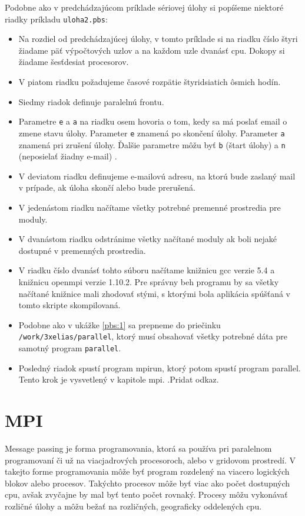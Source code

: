 Podobne ako v predchádzajúcom príklade sériovej úlohy si popíšeme niektoré riadky príkladu \texttt{uloha2.pbs}:
\begin{itemize}
\item
  Na rozdiel od predchádzajúcej úlohy, v tomto príklade si na riadku číslo štyri žiadame päť výpočtových uzlov a na každom uzle dvanásť \acrshort{cpu}.
  Dokopy si žiadame šesťdesiat procesorov.
\item
  V piatom riadku požadujeme časové rozpätie štyridsiatich ôsmich hodín.
\item
  Siedmy riadok definuje paralelnú frontu.
\item
  Parametre \texttt{e} a \texttt{a} na riadku osem hovoria o tom, kedy sa má poslať email o zmene stavu úlohy.
  Parameter \texttt{e} znamená po skončení úlohy.
  Parameter \texttt{a} znamená pri zrušení úlohy.
  Ďalšie parametre môžu byť \texttt{b} (štart úlohy) a \texttt{n} (neposielať žiadny e-mail) \cite{cmd:qsub}.
\item
  V deviatom riadku definujeme e-mailovú adresu, na ktorú bude zaslaný mail v prípade, ak úloha skončí alebo bude prerušená.
\item
  V jedenástom riadku načítame všetky potrebné premenné prostredia pre moduly.
\item
  V dvanástom riadku odstránime všetky načítané moduly ak boli nejaké dostupné v premenných prostredia.
\item
  V riadku číslo dvanásť tohto súboru načítame knižnicu gcc verzie 5.4 a knižnicu openmpi verzie 1.10.2.
  Pre správny beh programu by sa všetky načítané knižnice mali zhodovať stými, s ktorými bola aplikácia spúšťaná v tomto skripte skompilovaná.
\item
  Podobne ako v ukážke \ref{pbs:1} sa prepneme do priečinku \texttt{/work/3xelias/parallel}, ktorý musí obsahovať všetky potrebné dáta
  pre samotný program \texttt{parallel}.
\item
  Posledný riadok spustí program mpirun, ktorý potom spustí program parallel. Tento krok je vysvetlený v kapitole mpi. .Pridat odkaz.
\end{itemize}

\section{MPI}
Message passing je forma programovania, ktorá sa používa pri paralelnom programovaní či už na viacjadrových procesoroch, alebo v gridovom prostredí.
V takejto forme programovania môže byť program rozdelený na viacero logických blokov alebo procesov.
Takýchto procesov môže byť viac ako počet dostupných \acrshort{cpu}, avšak zvyčajne by mal byť tento počet rovnaký.
Procesy môžu vykonávať rozličné úlohy a môžu bežať na rozličných, geograficky oddelených \acrshort{cpu}.

